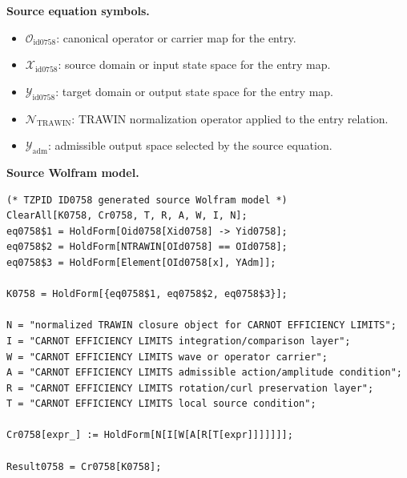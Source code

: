 \begin{minipage}[t]{0.49\linewidth}
\begingroup
\small
\raggedright
\textbf{Source equation symbols.}\par
\begin{itemize}[leftmargin=1.35em,itemsep=1pt,topsep=1pt,parsep=0pt]
    \item $\mathcal{O}_{\mathrm{id0758}}$: canonical operator or carrier map for the entry.
    \item $\mathcal{X}_{\mathrm{id0758}}$: source domain or input state space for the entry map.
    \item $\mathcal{Y}_{\mathrm{id0758}}$: target domain or output state space for the entry map.
    \item $\mathcal{N}_{\mathrm{TRAWIN}}$: TRAWIN normalization operator applied to the entry relation.
    \item $\mathcal{Y}_{\mathrm{adm}}$: admissible output space selected by the source equation.
\end{itemize}
\endgroup
\end{minipage}\hfill
\begin{minipage}[t]{0.47\linewidth}
\begingroup
\scriptsize
\raggedright
\textbf{Source Wolfram model.}\par
\begin{Verbatim}[fontsize=\tiny,breaklines=true,breakanywhere=true]
(* TZPID ID0758 generated source Wolfram model *)
ClearAll[K0758, Cr0758, T, R, A, W, I, N];
eq0758$1 = HoldForm[Oid0758[Xid0758] -> Yid0758];
eq0758$2 = HoldForm[NTRAWIN[OId0758] == OId0758];
eq0758$3 = HoldForm[Element[OId0758[x], YAdm]];

K0758 = HoldForm[{eq0758$1, eq0758$2, eq0758$3}];

N = "normalized TRAWIN closure object for CARNOT EFFICIENCY LIMITS";
I = "CARNOT EFFICIENCY LIMITS integration/comparison layer";
W = "CARNOT EFFICIENCY LIMITS wave or operator carrier";
A = "CARNOT EFFICIENCY LIMITS admissible action/amplitude condition";
R = "CARNOT EFFICIENCY LIMITS rotation/curl preservation layer";
T = "CARNOT EFFICIENCY LIMITS local source condition";

Cr0758[expr_] := HoldForm[N[I[W[A[R[T[expr]]]]]]];

Result0758 = Cr0758[K0758];
\end{Verbatim}
\endgroup
\end{minipage}

